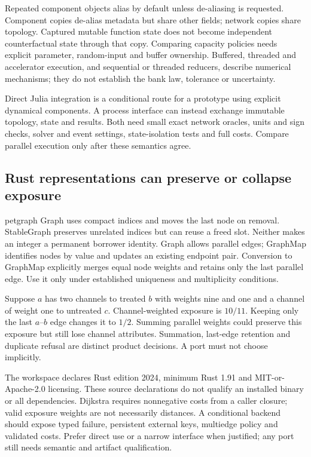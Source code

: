Repeated component objects alias by default unless de-aliasing is requested.
Component copies de-alias metadata but share other fields; network copies
share topology. Captured mutable function state does not become independent
counterfactual state through that copy. Comparing capacity policies needs
explicit parameter, random-input and buffer ownership. Buffered, threaded and
accelerator execution, and sequential or threaded reducers, describe numerical
mechanisms; they do not establish the bank law, tolerance or uncertainty.
\citep{exec25_onet_dynamics,exec25_onet_choice}

Direct Julia integration is a conditional route for a prototype using explicit
dynamical components. A process interface can instead exchange immutable
topology, state and results. Both need small exact network oracles, units and
sign checks, solver and event settings, state-isolation tests and full costs.
Compare parallel execution only after these semantics agree.
\citep{exec25_onet_choice}

\subsection{Rust representations can preserve or collapse exposure}

petgraph Graph uses compact indices and moves the last node on removal.
StableGraph preserves unrelated indices but can reuse a freed slot. Neither
makes an integer a permanent borrower identity. Graph allows parallel edges;
GraphMap identifies nodes by value and updates an existing endpoint pair.
Conversion to GraphMap explicitly merges equal node weights and retains only
the last parallel edge. Use it only under established uniqueness and
multiplicity conditions.~\citep{exec25_onet_petgraph}

Suppose $a$ has two channels to treated $b$ with weights nine and one and a
channel of weight one to untreated $c$. Channel-weighted exposure is $10/11$.
Keeping only the last $a$--$b$ edge changes it to $1/2$. Summing parallel
weights could preserve this exposure but still lose channel attributes.
Summation, last-edge retention and duplicate refusal are distinct product
decisions. A port must not choose implicitly.
\citep{exec25_onet_petgraph,exec25_onet_choice}

The workspace declares Rust edition 2024, minimum Rust 1.91 and
MIT-or-Apache-2.0 licensing. These source declarations do not qualify an
installed binary or all dependencies. Dijkstra requires nonnegative costs
from a caller closure; valid exposure weights are not necessarily distances.
A conditional backend should expose typed failure, persistent external keys,
multiedge policy and validated costs. Prefer direct use or a narrow interface
when justified; any port still needs semantic and artifact qualification.
\citep{exec25_onet_petgraph,exec25_onet_choice}

